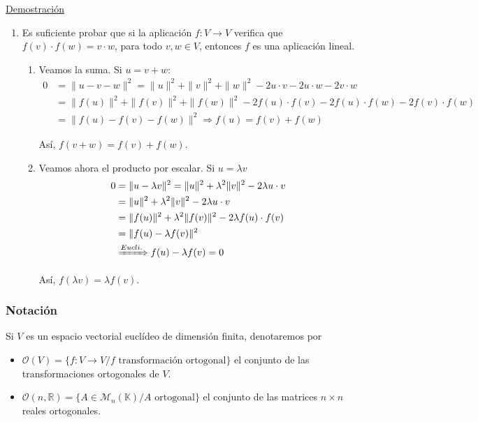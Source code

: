 \documentclass[12pt, a4paper, ones, notitlepage, openany,titlepage]{article}
\begin{document}
\noindent\underline{Demostración}
\begin{enumerate}[label=$\Longleftarrow/$]
	\item Es suficiente probar que si la aplicación $f: V \rightarrow V$ verifica que $f(v) \cdot f(w)=v \cdot w$, para todo $v, w \in V$, entonces $f$ es una aplicación lineal. 
	\begin{enumerate}[label=(\roman*)]
		\item Veamos la suma. Si $u=v+w$:
		$$
		\begin{aligned}
			0 & =\|u-v-w\|^{2}=\|u\|^{2}+\|v\|^{2}+\|w\|^{2}-2 u \cdot v-2 u \cdot w-2 v \cdot w \\
			& =\|f(u)\|^{2}+\|f(v)\|^{2}+\|f(w)\|^{2}-2 f(u) \cdot f(v)-2 f(u) \cdot f(w)-2 f(v) \cdot f(w) \\
			& =\|f(u)-f(v)-f(w)\|^{2} \Longrightarrow f(u) = f(v) + f(w)
		\end{aligned}
		$$
		
		Así, $f(v+w)=f(v)+f(w)$.
		
		\item Veamos ahora el producto por escalar. Si $u=\lambda v$
		$$
		\begin{aligned}
			0 & =\|u-\lambda v\|^{2}=\|u\|^{2}+\lambda^{2}\|v\|^{2}-2 \lambda u \cdot v \\
			& = \|u\|^2 + \lambda^2 \|v\|^2 - 2 \lambda u \cdot v \\
			& =\|f(u)\|^{2}+\lambda^{2}\|f(v)\|^{2}-2 \lambda f(u) \cdot f(v) \\
			& =\|f(u)-\lambda f(v)\|^{2} \\
			& \xRightarrow{Eucli.} f(u) - \lambda f(v) = 0
		\end{aligned}
		$$
		
		Así, $f(\lambda v)=\lambda f(v)$.
	\end{enumerate}
\end{enumerate}

\subsubsection{Notación}
Si $V$ es un espacio vectorial euclídeo de dimensión finita, denotaremos por
\begin{itemize}
	\item $\mathcal{O}(V) = \{f: V \rightarrow V / f \text{ transformación ortogonal}\}$ el conjunto de las transformaciones ortogonales de $V$.
	\item $\mathcal{O}(n, \mathbb{R}) = \{A \in \mathcal{M}_n (\mathbb{K}) / A \text{ ortogonal}\}$ el conjunto de las matrices $n \times n$ reales ortogonales.
\end{itemize}
\end{document}
